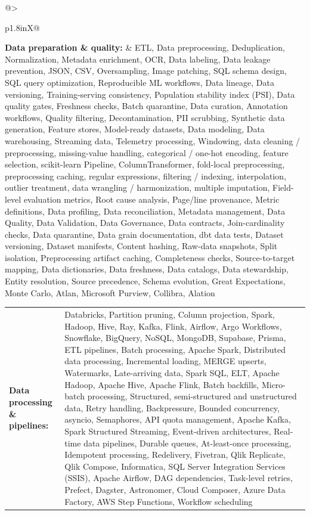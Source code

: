 \documentclass[letterpaper,11pt]{article}
\begin{document}
\begin{tabularx}{\linewidth}{@{}>{\raggedright\arraybackslash}p{1.8in}X@{}}
\textbf{Data preparation \& quality:} & \footnotesize{ETL, Data preprocessing, Deduplication, Normalization, Metadata enrichment, OCR, Data labeling, Data leakage prevention, JSON, CSV, Oversampling, Image patching, SQL schema design, SQL query optimization, Reproducible ML workflows, Data lineage, Data versioning, Training-serving consistency, Population stability index (PSI), Data quality gates, Freshness checks, Batch quarantine, Data curation, Annotation workflows, Quality filtering, Decontamination, PII scrubbing, Synthetic data generation, Feature stores, Model-ready datasets, Data modeling, Data warehousing, Streaming data, Telemetry processing, Windowing, data cleaning / preprocessing, missing-value handling, categorical / one-hot encoding, feature selection, scikit-learn Pipeline, ColumnTransformer, fold-local preprocessing, preprocessing caching, regular expressions, filtering / indexing, interpolation, outlier treatment, data wrangling / harmonization, multiple imputation, Field-level evaluation metrics, Root cause analysis, Page/line provenance, Metric definitions, Data profiling, Data reconciliation, Metadata management, Data Quality, Data Validation, Data Governance, Data contracts, Join-cardinality checks, Data quarantine, Data grain documentation, dbt data tests, Dataset versioning, Dataset manifests, Content hashing, Raw-data snapshots, Split isolation, Preprocessing artifact caching, Completeness checks, Source-to-target mapping, Data dictionaries, Data freshness, Data catalogs, Data stewardship, Entity resolution, Source precedence, Schema evolution, Great Expectations, Monte Carlo, Atlan, Microsoft Purview, Collibra, Alation}\\
\end{tabularx}
\par\vspace{2pt}
\begin{tabularx}{\linewidth}{@{}>{\raggedright\arraybackslash}p{1.8in}X@{}}
\textbf{Data processing \& pipelines:} & \footnotesize{Databricks, Partition pruning, Column projection, Spark, Hadoop, Hive, Ray, Kafka, Flink, Airflow, Argo Workflows, Snowflake, BigQuery, NoSQL, MongoDB, Supabase, Prisma, ETL pipelines, Batch processing, Apache Spark, Distributed data processing, Incremental loading, MERGE upserts, Watermarks, Late-arriving data, Spark SQL, ELT, Apache Hadoop, Apache Hive, Apache Flink, Batch backfills, Micro-batch processing, Structured, semi-structured and unstructured data, Retry handling, Backpressure, Bounded concurrency, asyncio, Semaphores, API quota management, Apache Kafka, Spark Structured Streaming, Event-driven architectures, Real-time data pipelines, Durable queues, At-least-once processing, Idempotent processing, Redelivery, Fivetran, Qlik Replicate, Qlik Compose, Informatica, SQL Server Integration Services (SSIS), Apache Airflow, DAG dependencies, Task-level retries, Prefect, Dagster, Astronomer, Cloud Composer, Azure Data Factory, AWS Step Functions, Workflow scheduling}\\
\end{tabularx}
\end{document}
